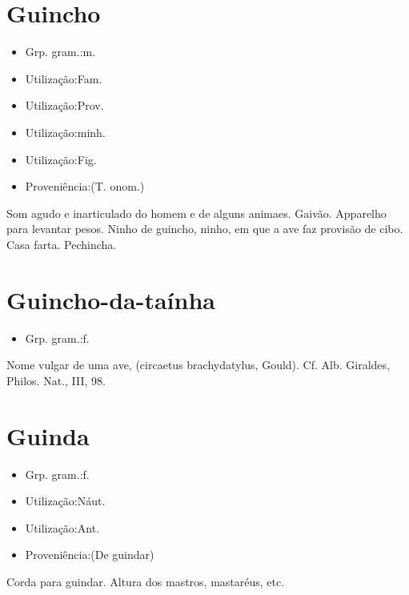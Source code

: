\section{Guincho}
\begin{itemize}
\item {Grp. gram.:m.}
\end{itemize}
\begin{itemize}
\item {Utilização:Fam.}
\end{itemize}
\begin{itemize}
\item {Utilização:Prov.}
\end{itemize}
\begin{itemize}
\item {Utilização:minh.}
\end{itemize}
\begin{itemize}
\item {Utilização:Fig.}
\end{itemize}
\begin{itemize}
\item {Proveniência:(T. onom.)}
\end{itemize}
Som agudo e inarticulado do homem e de alguns animaes.
Gaivão.
Apparelho para levantar pesos.
\textunderscore Ninho de guincho\textunderscore , ninho, em que a ave faz provisão de cibo.
Casa farta.
Pechincha.
\section{Guincho-da-taínha}
\begin{itemize}
\item {Grp. gram.:f.}
\end{itemize}
Nome vulgar de uma ave, (\textunderscore circaetus brachydatylus\textunderscore , Gould). Cf. Alb. Giraldes, \textunderscore Philos. Nat.\textunderscore , III, 98.
\section{Guinda}
\begin{itemize}
\item {Grp. gram.:f.}
\end{itemize}
\begin{itemize}
\item {Utilização:Náut.}
\end{itemize}
\begin{itemize}
\item {Utilização:Ant.}
\end{itemize}
\begin{itemize}
\item {Proveniência:(De \textunderscore guindar\textunderscore )}
\end{itemize}
Corda para guindar.
Altura dos mastros, mastaréus, etc.
